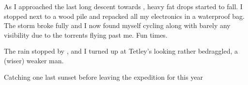 As I approached the last long descent towards , heavy fat drops started to fall. I stopped next to a wood pile and repacked all my electronics in a waterproof bag. The storm broke fully and I now found myself cycling along with barely any visibility due to the torrents flying past me. Fun times.

The rain stopped by , and I turned up at Tetley's looking rather bedraggled, a (wiser) weaker man.


\begin{pagefigure}
\checkoddpage \ifoddpage \forcerectofloat \else \forceversofloat \fi
\centering
 \caption{Catching one last sunset before leaving the expedition for this year }
 \label{jarv sunset}
\end{pagefigure}
